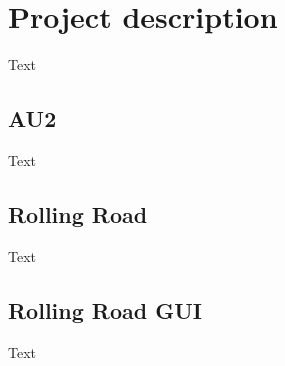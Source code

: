 \chapter{Project description}
Text

\section{AU2}
Text

\section{Rolling Road}
Text

\section{Rolling Road GUI}
Text